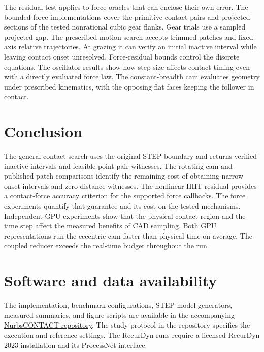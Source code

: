 \documentclass[a4paper,fleqn,longmktitle]{cas-sc}
\begin{document}
The residual test applies to force oracles that can enclose their own error. The bounded force implementations cover the primitive contact pairs and projected sections of the tested nonrational cubic gear flanks. Gear trials use a sampled projected gap. The prescribed-motion search accepts trimmed patches and fixed-axis relative trajectories. At grazing it can verify an initial inactive interval while leaving contact onset unresolved. Force-residual bounds control the discrete equations. The oscillator results show how step size affects contact timing even with a directly evaluated force law. The constant-breadth cam evaluates geometry under prescribed kinematics, with the opposing flat faces keeping the follower in contact.

\section{Conclusion}
The general contact search uses the original STEP boundary and returns verified inactive intervals and feasible point-pair witnesses. The rotating-cam and published patch comparisons identify the remaining cost of obtaining narrow onset intervals and zero-distance witnesses. The nonlinear HHT residual provides a contact-force accuracy criterion for the supported force callbacks. The force experiments quantify that guarantee and its cost on the tested mechanisms. Independent GPU experiments show that the physical contact region and the time step affect the measured benefits of CAD sampling. Both GPU representations run the eccentric cam faster than physical time on average. The coupled reducer exceeds the real-time budget throughout the run.

\section*{Software and data availability}
The implementation, benchmark configurations, STEP model generators, measured summaries, and figure scripts are available in the accompanying \href{https://github.com/W-Moorer/NurbsCONTACT}{NurbsCONTACT repository}. The study protocol in the repository specifies the execution and reference settings. The RecurDyn runs require a licensed RecurDyn 2023 installation and its ProcessNet interface.

\appendix





\end{document}
